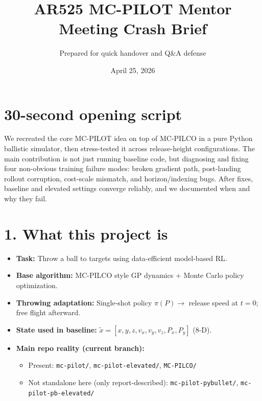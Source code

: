 \documentclass[11pt]{article}
\title{AR525 MC-PILOT Mentor Meeting Crash Brief}
\author{Prepared for quick handover and Q\&A defense}
\date{April 25, 2026}
\begin{document}
\maketitle
\thispagestyle{empty}

\section*{30-second opening script}
We recreated the core MC-PILOT idea on top of MC-PILCO in a pure Python ballistic simulator, then stress-tested it across release-height configurations. The main contribution is not just running baseline code, but diagnosing and fixing four non-obvious training failure modes: broken gradient path, post-landing rollout corruption, cost-scale mismatch, and horizon/indexing bugs. After fixes, baseline and elevated settings converge reliably, and we documented when and why they fail.

\section*{1. What this project is}
\begin{itemize}
\item \textbf{Task:} Throw a ball to targets using data-efficient model-based RL.
\item \textbf{Base algorithm:} MC-PILCO style GP dynamics + Monte Carlo policy optimization.
\item \textbf{Throwing adaptation:} Single-shot policy $\pi(P) \rightarrow$ release speed at $t=0$; free flight afterward.
\item \textbf{State used in baseline:} $\tilde{x} = [x,y,z,v_x,v_y,v_z,P_x,P_y]$ (8-D).
\item \textbf{Main repo reality (current branch):}
  \begin{itemize}
  \item Present: \texttt{mc-pilot/}, \texttt{mc-pilot-elevated/}, \texttt{MC-PILCO/}
  \item Not standalone here (only report-described): \texttt{mc-pilot-pybullet/}, \texttt{mc-pilot-pb-elevated/}
  \end{itemize}
\end{itemize}
\end{document}
